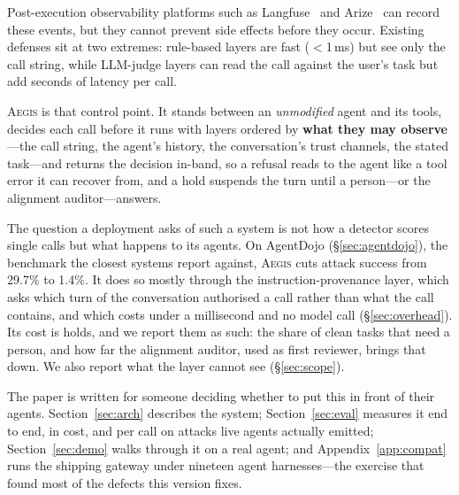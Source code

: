 \documentclass[sigconf,nonacm]{acmart}
\newcommand{\system}{\textsc{Aegis}\xspace}
\begin{document}
Post-execution observability platforms such as Langfuse~\cite{langfuse2024} and Arize~\cite{arize2024} can record these events, but they cannot prevent side effects before they occur.
Existing defenses sit at two extremes: rule-based layers are fast ($<$1\,ms) but see only the call string, while LLM-judge layers can read the call against the user's task but add seconds of latency per call.

\system{} is that control point. It stands between an \emph{unmodified}
agent and its tools, decides each call before it runs with layers ordered
by \textbf{what they may observe}---the call string, the agent's history,
the conversation's trust channels, the stated task---and returns the
decision in-band, so a refusal reads to the agent like a tool error it can recover from, and a hold suspends the turn until a person---or the alignment auditor---answers.

The question a deployment asks of such a system is not how a detector
scores single calls but what happens to its agents. On AgentDojo
(\S\ref{sec:agentdojo}), the benchmark the closest systems report against,
\system{} cuts attack success from 29.7\% to 1.4\%. It does so mostly
through the instruction-provenance layer, which asks which turn of the
conversation authorised a call rather than what the call contains, and
which costs under a millisecond and no model call
(\S\ref{sec:overhead}). Its cost is holds, and we report them as such:
the share of clean tasks that need a person, and how far the alignment
auditor, used as first reviewer, brings that down. We also report what
the layer cannot see (\S\ref{sec:scope}).

The paper is written for someone deciding whether to put this in front of
their agents. Section~\ref{sec:arch} describes the system; Section~\ref{sec:eval}
measures it end to end, in cost, and per call on attacks live agents
actually emitted; Section~\ref{sec:demo} walks through it on a real agent;
and Appendix~\ref{app:compat} runs the shipping gateway under nineteen
agent harnesses---the exercise that found most of the defects this
version fixes.
\end{document}
